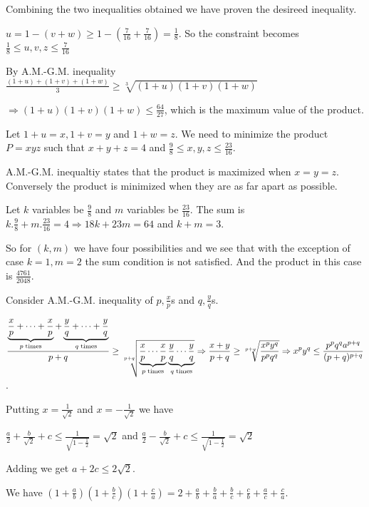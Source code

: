   Combining the two inequalities obtained we have proven the desireed inequality.
\item $u = 1 - (v + w)\geq 1 - \left(\frac{7}{16} + \frac{7}{16}\right) = \frac{1}{8}$. So the constraint
  becomes $\frac{1}{8}\leq u, v, z\leq \frac{7}{16}$

  By A.M.-G.M. inequality $\frac{(1 + u) + (1 + v) + (1 + w)}{3}\geq \sqrt[3]{(1 + u)(1 + v)(1 + w)}$

  $\Rightarrow (1 + u)(1 + v)(1 + w)\leq \frac{64}{27}$, which is the maximum value of the product.

  Let $1 + u = x, 1 + v = y$ and $1 + w = z$. We need to minimize the product $P = xyz$ such that $x + y + z
  = 4$ and $\frac{9}{8}\leq x, y, z\leq \frac{23}{16}$.

  A.M.-G.M. inequaltiy states that the product is maximized when $x = y = z$. Conversely the product is
  minimized when they are as far apart as possible.

  Let $k$ variables be $\frac{9}{8}$ and $m$ variables be $\frac{23}{16}$. The sum is $k.\frac{9}{8} +
  m.\frac{23}{16} = 4 \Rightarrow 18k + 23m = 64$ and $k + m = 3$.

  So for $(k, m)$ we have four possibilities and we see that with the exception of case $k = 1, m = 2$ the
  sum condition is not satisfied. And the product in this case is $\frac{4761}{2048}$.
\item Consider A.M.-G.M. inequality of $p, \frac{x}{p}$s and $q, \frac{y}{q}$s.

  $\displaystyle\frac{\underbrace{\frac{x}{p} + \cdots + \frac{x}{p}}_{p\;\rm {times}} + \underbrace{\frac{y}{q} +
    \cdots + \frac{y}{q}}_{q\;\rm {times}}}{p + q}\geq \sqrt[p + q]{\underbrace{\frac{x}{p} \cdots
  \frac{x}{p}}_{p\;\rm {times}}\underbrace{\frac{y}{q} \cdots \frac{y}{q}}_{q\;\rm {times}}} \Rightarrow
  \displaystyle\frac{x + y}{p + q}\geq \sqrt[p + q]{\frac{x^py^q}{p^pq^q}} \Rightarrow
  x^py^q\leq \frac{p^pq^qa^{p + q}}{(p + q)^{p + q}}$.
\item Putting $x = \frac{1}{\sqrt{2}}$ and $x = -\frac{1}{\sqrt{2}}$ we have

  $\frac{a}{2} + \frac{b}{\sqrt{2}} + c\leq \frac{1}{\sqrt{1 - \frac{1}{2}}} = \sqrt{2}$ and $\frac{a}{2}
  - \frac{b}{\sqrt{2}} + c\leq \frac{1}{\sqrt{1 - \frac{1}{2}}} = \sqrt{2}$

  Adding we get $a + 2c\leq 2\sqrt{2}$.
\item We have $\left(1 + \frac{a}{b}\right)\left(1 + \frac{b}{c}\right)\left(1 + \frac{c}{a}\right) = 2
  + \frac{a}{b} + \frac{b}{a} + \frac{b}{c} + \frac{c}{b} + \frac{a}{c} + \frac{c}{a}$.

